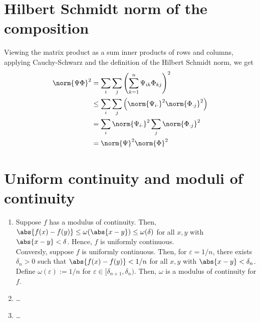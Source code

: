\documentclass{article}
\begin{document}
\section{Hilbert Schmidt norm of the composition}
Viewing the matrix product as a sum inner products of rows and columns, applying Cauchy-Schwarz and the definition of the Hilbert Schmidt norm, we get
\begin{align*}
    \norm{\Psi \Phi}^2 &= \sum_{i} \sum_{j} \left(\sum_{k=1}^n \Psi _{ik} \Phi_{kj}\right)^2 \\
    &\leq \sum_{i} \sum_{j} \left(\norm{\Psi _{i\cdot}}^2 \norm{\Phi_{\cdot j}}^2\right) \\
    &= \sum_{i} \norm{\Psi _{i\cdot}}^2 \sum_{j} \norm{\Phi_{\cdot j}}^2 \\
    &= \norm{\Psi }^2 \norm{\Phi}^2
\end{align*}

\section{Uniform continuity and moduli of continuity}
\begin{enumerate}
    \item Suppose $f$ has a modulus of continuity. Then, $\abs{f(x) - f(y)} \leq \omega(\abs{x - y}) \leq \omega(\delta)$ for all $x, y$ with $\abs{x - y} < \delta$. Hence, $f$ is uniformly continuous. \\
    Conversly, suppose $f$ is uniformly continuous. Then, for $\varepsilon = 1/n$, there exists $\delta_n > 0$ such that $\abs{f(x) - f(y)} < 1/n$ for all $x, y$ with $\abs{x - y} < \delta_n$. Define $\omega(\varepsilon) := 1/n$ for $\varepsilon \in [\delta_{n+1}, \delta_n)$. Then, $\omega$ is a modulus of continuity for $f$.
    \item \dots 
    \item \dots
\end{enumerate}
\end{document}
